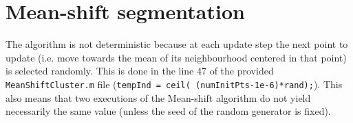 \section{Mean-shift segmentation}

The algorithm is not deterministic because at each update step the next
point to update (i.e. move towards the mean of its neighbourhood
centered in that point) is selected randomly. This is done in the 
line 47 of the provided \texttt{MeanShiftCluster.m} file
(\texttt{tempInd = ceil( (numInitPts-1e-6)*rand);}).
This also means that two executions of the Mean-shift algorithm do
not yield necessarily the same value
(unless the seed of the random generator is fixed).